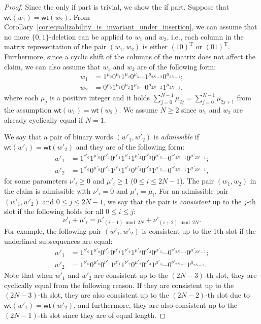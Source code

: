 \documentclass{article}
\theoremstyle{definition}
\newcommand{\wt}{\mathsf{wt}}
\begin{document}
\begin{proof}
    Since the only if part is trivial, we show the if part. 
    Suppose that $\wt(w_1) = \wt(w_2)$. From Corollary~\ref{cor:equalizability_is_invariant_under_insertion}, we can assume that no more $\{0,1\}$-deletion can be applied to $w_1$ and $w_2$, i.e., each column in the matrix representation of the pair $(w_1,w_2)$ is either $(10)^{\mathrm{T}}$ or $(01)^{\mathrm{T}}$.
    Furthermore, since a cyclic shift of the columns of the matrix does not affect the claim, we can also assume that $w_1$ and $w_2$ are of the following form:
    \[
        \begin{split}
            w_1 &= 1^{\mu_0} 0^{\mu_1} 1^{\mu_2} 0^{\mu_3} \cdots 1^{\mu_{2N-2}} 0^{\mu_{2N-1}};\\
            w_2 &= 0^{\mu_0} 1^{\mu_1} 0^{\mu_2} 1^{\mu_3} \cdots 0^{\mu_{2N-2}} 1^{\mu_{2N-1}},
        \end{split}
    \]
    where each $\mu_j$ is a positive integer and it holds $\sum_{j=0}^{N-1} \mu_{2j} = \sum_{j=0}^{N-1} \mu_{2j+1}$ from the assumption $\wt(w_1) = \wt(w_2)$.
    We assume $N \geq 2$ since $w_1$ and $w_2$ are already cyclically equal if $N = 1$. 

    We say that a pair of binary words $(w'_1, w'_2)$ is \emph{admissible} if $\wt(w'_1) = \wt(w'_2)$ and they are of the following form:
    \[
        \begin{split}
            w'_1 &= 1^{\nu'_0} 1^{\mu'_0} 0^{\nu'_1} 0^{\mu'_1} 1^{\nu'_2} 1^{\mu'_2} 0^{\nu'_3} 0^{\mu'_3} \cdots 0^{\nu'_{2N-1}} 0^{\mu'_{2N-1}}; \\
            w'_2 &= 1^{\nu'_0} 0^{\mu'_0} 0^{\nu'_1} 1^{\mu'_1} 1^{\nu'_2} 0^{\mu'_2} 0^{\nu'_3} 1^{\mu'_3} \cdots  0^{\nu'_{2N-1}} 1^{\mu'_{2N-1}},
        \end{split}
    \]
    for some parameters $\nu'_i \geq 0$ and $\mu'_i \geq 1$ ($0 \leq i \leq 2N-1$). 
    The pair $(w_1,w_2)$ in the claim is admissible with $\nu'_i = 0$ and $\mu'_i = \mu_i$. 
    For an admissible pair $(w'_1, w'_2)$ and $0 \leq j \leq 2N-1$, we say that the pair is \emph{consistent} up to the $j$-th slot if the following holds for all $0 \leq i \leq j$:
    \[
    \nu'_i + \mu'_i = \mu'_{(i+1) \bmod 2N} + \nu'_{(i+2) \bmod 2N}.
    \]
    For example, the following pair $(w'_1, w'_2)$ is consistent up to the 1th slot if the underlined subsequences are equal:
    \[
        \begin{split}
            w'_1 &= \underline{1^{\nu'_0} 1^{\mu'_0} 0^{\nu'_1} 0^{\mu'_1}} 1^{\nu'_2} 1^{\mu'_2} 0^{\nu'_3} 0^{\mu'_3} \cdots 0^{\nu'_{2N-1}} 0^{\mu'_{2N-1}}; \\
            w'_2 &= 1^{\nu'_0} 0^{\mu'_0} 0^{\nu'_1} \underline{1^{\mu'_1} 1^{\nu'_2} 0^{\mu'_2} 0^{\nu'_3}} 1^{\mu'_3} \cdots  0^{\nu'_{2N-1}} 1^{\mu_{2N-1}}.
        \end{split}    
    \]
    Note that when $w'_1$ and $w'_2$ are consistent up to the $(2N-3)$-th slot, they are cyclically equal from the following reason. 
    If they are consistent up to the $(2N-3)$-th slot, they are also consistent up to the $(2N-2)$-th slot due to $\wt(w'_1) = \wt(w'_2)$, and furthermore, they are also consistent up to the $(2N-1)$-th slot since they are of equal length. 
    

\end{proof}
\end{document}
